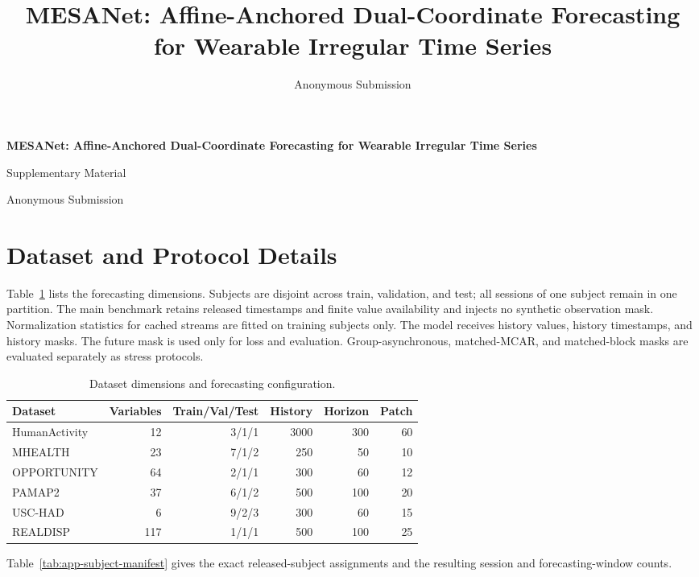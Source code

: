 \documentclass[letterpaper,10pt]{article}
\title{MESANet: Affine-Anchored Dual-Coordinate Forecasting for Wearable Irregular Time Series}
\author{Anonymous Submission}
\date{}
\begin{document}
\renewcommand{\thetable}{A\arabic{table}}
\renewcommand{\thefigure}{A\arabic{figure}}
\begin{center}
{\Large\bfseries MESANet: Affine-Anchored Dual-Coordinate Forecasting for
Wearable Irregular Time Series\par}
\vspace{2pt}
{\large Supplementary Material\par}
\vspace{4pt}
Anonymous Submission
\end{center}

\section{Dataset and Protocol Details}

Table~\ref{tab:v665-data} lists the forecasting dimensions. Subjects are
disjoint across train, validation, and test; all sessions of one subject remain
in one partition. The main benchmark retains released timestamps and finite
value availability and injects no synthetic observation mask. Normalization
statistics for cached streams are fitted on training subjects only. The model
receives history values, history timestamps, and history masks. The future
mask is used only for loss and evaluation. Group-asynchronous, matched-MCAR,
and matched-block masks are evaluated separately as stress protocols.

\begin{table}[H]
\centering
\setlength{\tabcolsep}{5pt}
\caption{Dataset dimensions and forecasting configuration.}
\label{tab:v665-data}
\begin{tabular}{@{}lrrrrr@{}}
\toprule
Dataset & Variables & Train/Val/Test & History & Horizon & Patch \\
\midrule
HumanActivity & 12 & 3/1/1 & 3000 & 300 & 60 \\
MHEALTH & 23 & 7/1/2 & 250 & 50 & 10 \\
OPPORTUNITY & 64 & 2/1/1 & 300 & 60 & 12 \\
PAMAP2 & 37 & 6/1/2 & 500 & 100 & 20 \\
USC-HAD & 6 & 9/2/3 & 300 & 60 & 15 \\
REALDISP & 117 & 1/1/1 & 500 & 100 & 25 \\
\bottomrule
\end{tabular}
\end{table}



Table~\ref{tab:app-subject-manifest} gives the exact released-subject
assignments and the resulting session and forecasting-window counts.
\end{document}
